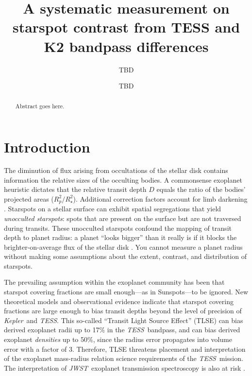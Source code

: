 \documentclass[modern]{aastex631}
\newcommand{\tess}{{\it TESS}}
\newcommand{\jwst}{{\it JWST}}
\newcommand{\kepler}{{\it Kepler}}
\begin{document}
\title{A systematic measurement on starspot contrast from TESS and K2
  bandpass differences}

\author{TBD}

\author{TBD}


\begin{abstract}

  Abstract goes here.

\end{abstract}


\section{Introduction}\label{sec:intro}

The diminution of flux arising from occultations of the stellar disk contains information the relative sizes of the occulting bodies.  A commonsense exoplanet heuristic dictates that the relative transit depth $D$ equals the ratio of the bodies' projected areas ($R_p^2/R_\star^2$).  Additional correction factors account for limb darkening \citep{2002ApJ...580L.171M}.  Starspots on a stellar surface can exhibit spatial segregations
that yield \emph{unocculted starspots}: spots that are present on the surface but are not traversed during transits.  These unocculted starspots confound the mapping of transit depth to planet radius: a planet ``looks bigger'' than it really is if it blocks the brighter-on-average flux of the stellar disk \citep{2018AJ....156...91M}.  You cannot measure a planet radius without making some assumptions about the extent, contrast, and distribution of starspots.

The prevailing assumption within the exoplanet community has been that starspot covering fractions are small enough---as in Sunspots---to be ignored.  New theoretical models \citep{2018ApJ...853..122R} and observational evidence \citep{2016MNRAS.463.2494F} indicate that starspot covering fractions are large enough to bias transit depths beyond the level of precision of \kepler\ and \tess.  This so-called ``Transit Light Source Effect'' (TLSE) can bias derived exoplanet radii up to 17\% in the \tess\ bandpass, and can bias derived exoplanet \emph{densities} up to 50\%, since the radius error propagates into volume error with a factor of 3.  Therefore, TLSE threatens placement and interpretation of the exoplanet mass-radius relation science requirements of the \tess\ mission.  The interpretation of \jwst\ exoplanet transmission spectroscopy is also at risk \citep{2019AJ....157...11W}.
\end{document}
